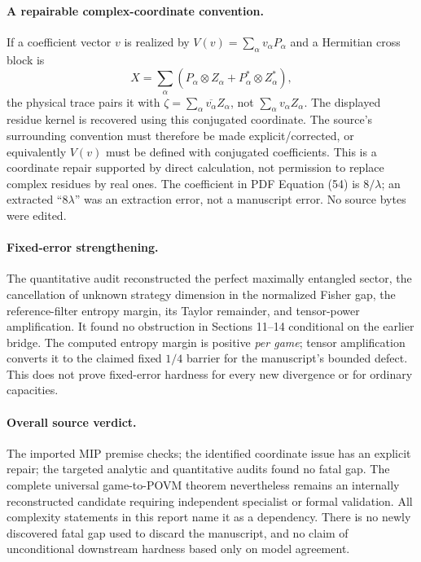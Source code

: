 \documentclass[11pt]{article}
\begin{document}
\paragraph{A repairable complex-coordinate convention.}
If a coefficient vector $v$ is realized by
$V(v)=\sum_\alpha v_\alpha P_\alpha$ and a Hermitian cross block is
\[
 X=\sum_\alpha(P_\alpha\otimes Z_\alpha+
                 P_\alpha^*\otimes Z_\alpha^*),
\]
the physical trace pairs it with
$\zeta=\sum_\alpha\overline{v_\alpha}Z_\alpha$, not
$\sum_\alpha v_\alpha Z_\alpha$. The displayed residue kernel is recovered
using this conjugated coordinate. The source's surrounding convention must
therefore be made explicit/corrected, or equivalently $V(v)$ must be defined
with conjugated coefficients. This is a coordinate repair supported by direct
calculation, not permission to replace complex residues by real ones. The
coefficient in PDF Equation (54) is $8/\lambda$; an extracted ``$8\lambda$''
was an extraction error, not a manuscript error. No source bytes were edited.

\paragraph{Fixed-error strengthening.}
The quantitative audit reconstructed the perfect maximally entangled sector,
the cancellation of unknown strategy dimension in the normalized Fisher gap,
the reference-filter entropy margin, its Taylor remainder, and tensor-power
amplification. It found no obstruction in Sections 11--14 conditional on the
earlier bridge. The computed entropy margin is positive \emph{per game};
tensor amplification converts it to the claimed fixed $1/4$ barrier for the
manuscript's bounded defect. This does not prove fixed-error hardness for every
new divergence or for ordinary capacities.

\paragraph{Overall source verdict.}
The imported MIP premise checks; the identified coordinate issue has an explicit
repair; the targeted analytic and quantitative audits found no fatal gap.
The complete universal game-to-POVM theorem nevertheless remains an internally
reconstructed candidate requiring independent specialist or formal validation.
All complexity statements in this report name it as a dependency. There is no
newly discovered fatal gap used to discard the manuscript, and no claim of
unconditional downstream hardness based only on model agreement.
\end{document}
